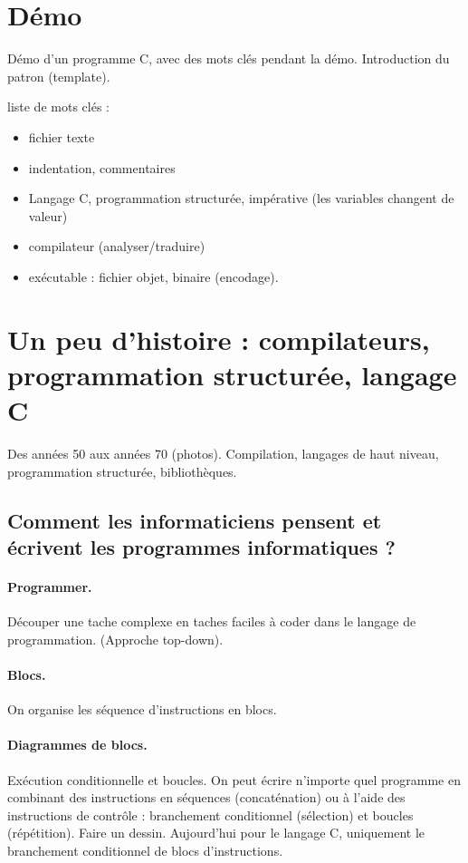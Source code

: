 \documentclass[12pt,a4paper]{article}
\begin{document}
\section{Démo}
Démo d'un programme C, avec des mots clés pendant la
démo. Introduction du patron (template).

liste de mots clés :
\begin{itemize}
\item fichier texte
\item indentation, commentaires
\item Langage C, programmation structurée, impérative (les variables
  changent de valeur)
\item compilateur (analyser/traduire)
\item exécutable : fichier objet, binaire (encodage).
\end{itemize}

\section{Un peu d'histoire : compilateurs, programmation structurée,
  langage C}

Des années 50 aux années 70 (photos). Compilation, langages de haut niveau,
programmation structurée, bibliothèques.

\subsection{Comment les informaticiens pensent et écrivent les
  programmes informatiques ?}

\paragraph{Programmer.} Découper une tache complexe en taches faciles à coder
dans le langage de programmation. (Approche top-down).

\paragraph{Blocs.} On organise les séquence d'instructions en blocs.

\paragraph{Diagrammes de blocs.} Exécution conditionnelle et boucles. On peut
écrire n'importe quel programme en combinant des instructions en
séquences (concaténation) ou à l'aide des instructions de contrôle :
branchement conditionnel (sélection) et boucles (répétition). Faire un
dessin. Aujourd'hui pour le langage C, uniquement le branchement
conditionnel de blocs d'instructions.
\end{document}
